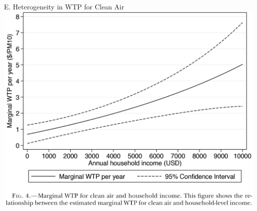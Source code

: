 \documentclass{beamer}
\begin{document}
\begin{frame}{E. Heterogeneity in WTP for Clean Air}
	\centering
	\includegraphics[scale=0.37]{figure4.png}	
\end{frame}

\end{document}

